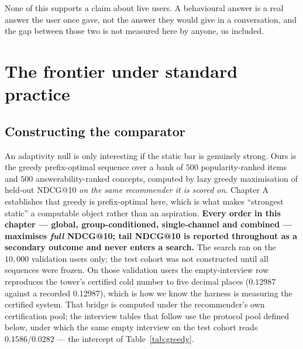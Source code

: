 \documentclass[11pt]{article}
\begin{document}
None of this supports a claim about live users. A behavioural answer is a real answer the user
once gave, not the answer they would give in a conversation, and the gap between those two is not
measured here by anyone, us included.

\section{The frontier under standard practice}
\label{sec:act1}

\subsection{Constructing the comparator}

An adaptivity null is only interesting if the static bar is genuinely strong. Ours is the greedy
prefix-optimal sequence over a bank of $500$ popularity-ranked items and $500$ answerability-ranked
concepts, computed by lazy greedy maximisation of held-out NDCG@10 \emph{on the same recommender it
is scored on}. Chapter A establishes that greedy is prefix-optimal here, which is what makes
``strongest static'' a computable object rather than an aspiration. \textbf{Every order in this
chapter --- global, group-conditioned, single-channel and combined --- maximises \emph{full}
NDCG@10; tail NDCG@10 is reported throughout as a secondary outcome and never enters a search.}
The search ran on the
$10{,}000$ validation users only; the test cohort was not constructed until all sequences were
frozen. On those validation users the empty-interview row reproduces the tower's certified cold
number to five decimal places ($0.12987$ against a recorded $0.12987$), which is how we know the
harness is measuring the certified system. That bridge is computed under the recommender's own
certification pool; the interview tables that follow use the protocol pool defined below, under
which the same empty interview on the test cohort reads $0.1586/0.0282$ --- the intercept of
Table~\ref{tab:greedy}.
\end{document}
